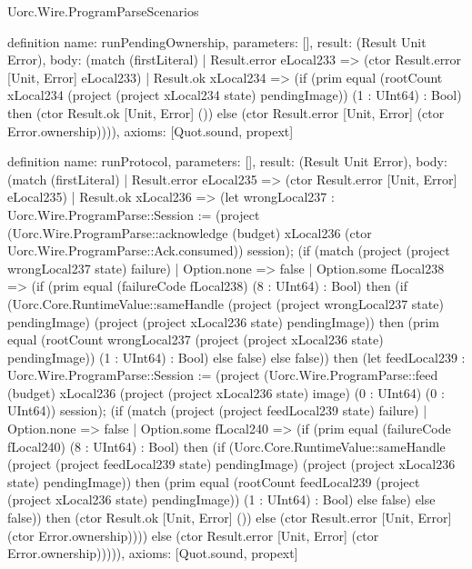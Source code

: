 \begin{lexlean}{Uorc.Wire.ProgramParseScenarios}
\begin{semanticmodule}
definition{
  name: runPendingOwnership,
  parameters: [],
  result: (Result Unit Error),
  body: (match (firstLiteral)
    | Result.error eLocal233 => (ctor Result.error [Unit, Error] eLocal233)
    | Result.ok xLocal234 => (if (prim equal (rootCount xLocal234 (project (project xLocal234 state) pendingImage)) (1 : UInt64) : Bool) then (ctor Result.ok [Unit, Error] ()) else (ctor Result.error [Unit, Error] (ctor Error.ownership)))),
  axioms: [Quot.sound, propext]
}

definition{
  name: runProtocol,
  parameters: [],
  result: (Result Unit Error),
  body: (match (firstLiteral)
    | Result.error eLocal235 => (ctor Result.error [Unit, Error] eLocal235)
    | Result.ok xLocal236 => (let wrongLocal237 : Uorc.Wire.ProgramParse::Session := (project (Uorc.Wire.ProgramParse::acknowledge (budget) xLocal236 (ctor Uorc.Wire.ProgramParse::Ack.consumed)) session); (if (match (project (project wrongLocal237 state) failure)
      | Option.none => false
      | Option.some fLocal238 => (if (prim equal (failureCode fLocal238) (8 : UInt64) : Bool) then (if (Uorc.Core.RuntimeValue::sameHandle (project (project wrongLocal237 state) pendingImage) (project (project xLocal236 state) pendingImage)) then (prim equal (rootCount wrongLocal237 (project (project xLocal236 state) pendingImage)) (1 : UInt64) : Bool) else false) else false)) then (let feedLocal239 : Uorc.Wire.ProgramParse::Session := (project (Uorc.Wire.ProgramParse::feed (budget) xLocal236 (project (project xLocal236 state) image) (0 : UInt64) (0 : UInt64)) session); (if (match (project (project feedLocal239 state) failure)
      | Option.none => false
      | Option.some fLocal240 => (if (prim equal (failureCode fLocal240) (8 : UInt64) : Bool) then (if (Uorc.Core.RuntimeValue::sameHandle (project (project feedLocal239 state) pendingImage) (project (project xLocal236 state) pendingImage)) then (prim equal (rootCount feedLocal239 (project (project xLocal236 state) pendingImage)) (1 : UInt64) : Bool) else false) else false)) then (ctor Result.ok [Unit, Error] ()) else (ctor Result.error [Unit, Error] (ctor Error.ownership)))) else (ctor Result.error [Unit, Error] (ctor Error.ownership))))),
  axioms: [Quot.sound, propext]
}


\end{semanticmodule}
\end{lexlean}
